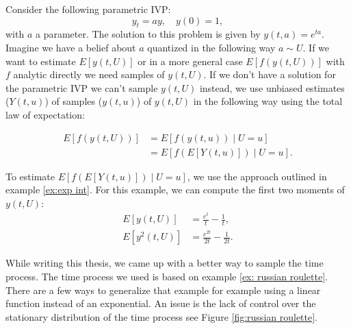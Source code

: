 \documentclass[a4paper,12pt]{article}
\begin{document}
\begin{example} \label{ex:random ode}
    Consider the following parametric IVP:
    \begin{equation}\label{eq:random ode}
        y_t = ay, \quad y(0)=1,
    \end{equation}
    with $a$ a parameter. The solution to this problem is given by
    $y(t,a) = e^{ta}$. Imagine we have a belief about $a$ quantized
    in the following way $a\sim U$. If we want
    to estimate $E[y(t, U)]$ or in a more general case
    $E[f(y(t, U))]$ with $f$ analytic directly
    we need samples of $y(t,U)$. If we don't have a solution for the parametric IVP
    we can't sample $y(t,U)$ instead, we use unbiased estimates ($Y(t,u)$) of samples ($y(t,u)$)
    of $y(t, U)$ in the following
    way using the total law of expectation:

    \begin{align}
        E[f(y(t,U))] & = E[f(y(t,u)) \mid U=u]     \\
                     & = E[f(E[Y(t,u)]) \mid U=u].
    \end{align}

    To estimate $E[f(E[Y(t,u)]) \mid U =u]$, we use the approach outlined in
    example \ref{ex:exp int}. For this example,
    we can compute the first two moments of $y(t, U)$:
    \begin{align}
        E[y(t,U)]      & = \frac{e^t}{t} - \frac{1}{t},      \\
        E[y^{2}(t, U)] & = \frac{e^{2t}}{2t} - \frac{1}{2t}.
    \end{align}
\end{example}

\begin{pythonn}
\end{pythonn}

\vspace{0.5cm}

While writing this thesis, we came up with a better way to sample the time process.
The time process we used is based on example \ref{ex: russian roulette}.
There are a few ways to generalize that example for example using a linear function
instead of an exponential. An issue is the lack of control over the stationary
distribution of the time process see Figure \ref{fig:russian roulette}.
\end{document}
